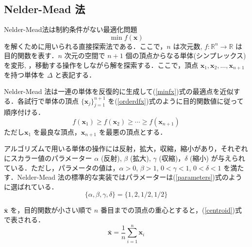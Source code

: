 \documentclass[twocolumn]{jarticle}
\begin{document}
    \subsection{Nelder-Mead 法}
    Nelder-Mead法\cite{10.1093/comjnl/7.4.308}は制約条件がない最適化問題
    \begin{equation}
        \label{minfx}
        \min f(\bm{x})
    \end{equation}
    を解くために用いられる直接探索法である．\cite{gao2012implementing}ここで，$n$ は次元数, $f: \mathbb{R}^n \rightarrow \mathbb{R}$ は目的関数を表す．$n$ 次元の空間で $n+1$ 個の頂点からなる単体(シンプレックス)を変形, ，移動する操作をしながら解を探索する．ここで，頂点 $\bm{x}_1, \bm{x}_2, \dots , \bm{x}_{n+1}$ を持つ単体を $\Delta$ と表記する． 
    
    Nelder-Mead 法は一連の単体を反復的に生成して(\ref{minfx})式の最適点を近似する．各試行で単体の頂点 $\{\bm{x}_j\}_{j=1}^{n+1}$ を(\ref{orderdfx})式のように目的関数値に従って順序付ける．
    \begin{equation}
        \label{orderdfx}
        f(\bm{x}_1) \geq f(\bm{x}_2) \geq \cdots \geq f(\bm{x}_{n+1})
    \end{equation}
    ただし$\bm{x}_1$ を最良な頂点，$\bm{x}_{n+1}$ を最悪の頂点とする．

    アルゴリズムで用いる単体の操作には反射，拡大，収縮，縮小があり，それぞれにスカラー値のパラメーター $\alpha$ (反射), $\beta$ (拡大), $\gamma$ (収縮)，$\delta$ (縮小) が与えられている．ただし，パラメータの値は，$\alpha > 0$, $\beta > 1$, $0 < \gamma < 1$, $0 < \delta < 1$ を満たす．Nelder-Mead 法の標準的な実装ではパラメーターは(\ref{parameters})式のように選ばれている．
    \begin{equation}
        \label{parameters}
        \{\alpha, \beta, \gamma, \delta\} = \{1, 2, 1/2, 1/2\}
    \end{equation}
    
    $\bar{\bm{x}}$ を，目的関数が小さい順で $n$ 番目までの頂点の重心とすると，(\ref{centroid})式で表される．
    \begin{equation}
        \label{centroid}
        \bar{\bm{x}} = \frac{1}{n}\sum_{i=1}^n\bm{x}_i
    \end{equation}
\end{document}
